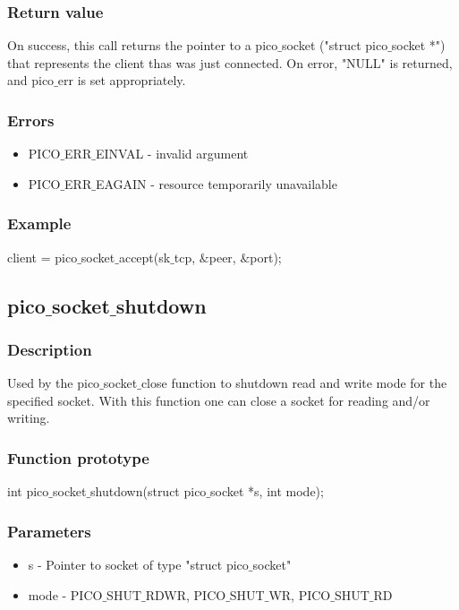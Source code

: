 \subsubsection*{Return value}
On success, this call returns the pointer to a pico$\_$socket ("struct pico$\_$socket *") that
represents the client thas was just connected. On error, "NULL" is returned, and pico$\_$err
is set appropriately.

\subsubsection*{Errors}
\begin{itemize}
\item PICO$\_$ERR$\_$EINVAL - invalid argument
\item PICO$\_$ERR$\_$EAGAIN - resource temporarily unavailable
\end{itemize}

\subsubsection*{Example}
client = pico$\_$socket$\_$accept(sk$\_$tcp, $\&$peer, $\&$port);


\subsection{pico$\_$socket$\_$shutdown}

\subsubsection*{Description}
Used by the pico$\_$socket$\_$close function to shutdown read and write mode for
the specified socket. With this function one can close a socket for reading
and/or writing.

\subsubsection*{Function prototype}
int pico$\_$socket$\_$shutdown(struct pico$\_$socket *s, int mode);

\subsubsection*{Parameters}
\begin{itemize}
\item s - Pointer to socket of type "struct pico$\_$socket"
\item mode - PICO$\_$SHUT$\_$RDWR, PICO$\_$SHUT$\_$WR, PICO$\_$SHUT$\_$RD
\end{itemize}

